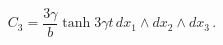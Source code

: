 \begin{equation}
C_{3}=\frac{3\gamma }{b}\tanh 3\gamma t\, dx_{1}\wedge dx_{2}\wedge dx_{3}\, .
\end{equation}

